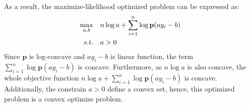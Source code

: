 \documentclass[10pt,a4paper]{article}
\begin{document}
As a result, the maximize-likelihood optimized problem can be expressed as:
\begin{equation}
	\begin{aligned}
		\displaystyle\max_{a, b} \quad & n \log{a} + \displaystyle\sum_{i = 1}^{n} \log{\mathbf{p}(a y_{i} - b)} \\
		\textsl{s.t.} \quad & a > 0
	\end{aligned}
	\label{5_a}
\end{equation}
Since $\mathbf{p}$ is log-concave and $ay_{i} - b$ is linear function, the term $\displaystyle\sum_{i = 1}^{n} \log{\mathbf{p}(a y_{i} - b)}$ is concave. Furthermore, as $n \log{a}$ is also concave, the whole objective function $n \log{a} + \displaystyle\sum_{i = 1}^{n} \log{\mathbf{p}(a y_{i} - b)}$ is concave. Additionally, the constrain $a > 0$ define a convex set, hence, this optimized problem is a convex optimize problem.
\end{document}

